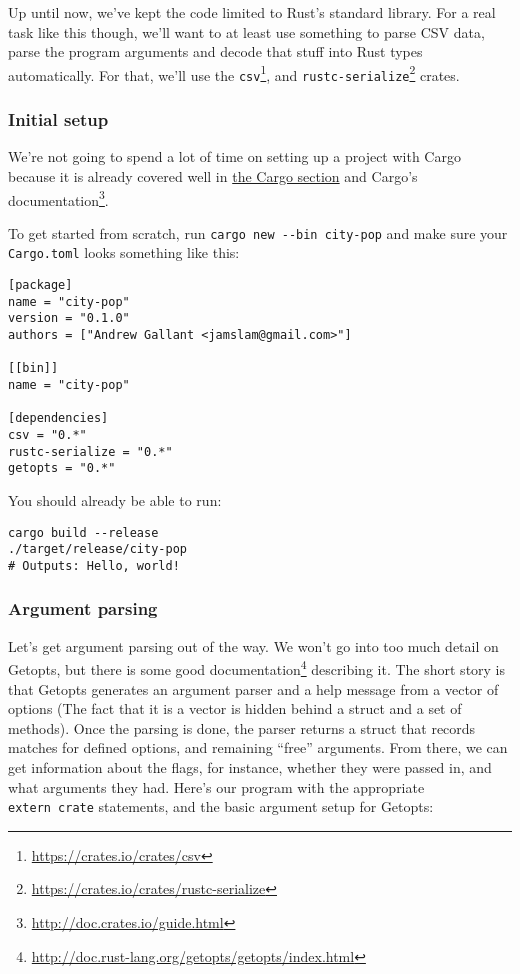 \documentclass[a4paper,]{book}
\renewcommand{\href}[2]{#2\footnote{\url{#1}}}
\begin{document}
Up until now, we've kept the code limited to Rust's standard library.
For a real task like this though, we'll want to at least use something
to parse CSV data, parse the program arguments and decode that stuff
into Rust types automatically. For that, we'll use the
\href{https://crates.io/crates/csv}{\texttt{csv}}, and
\href{https://crates.io/crates/rustc-serialize}{\texttt{rustc-serialize}}
crates.

\hypertarget{initial-setup}{\subsubsection{Initial
setup}\label{initial-setup}}

We're not going to spend a lot of time on setting up a project with
Cargo because it is already covered well in
\protect\hyperlink{hello-cargo}{the Cargo section} and
\href{http://doc.crates.io/guide.html}{Cargo's documentation}.

To get started from scratch, run \texttt{cargo\ new\ -\/-bin\ city-pop}
and make sure your \texttt{Cargo.toml} looks something like this:

\begin{verbatim}
[package]
name = "city-pop"
version = "0.1.0"
authors = ["Andrew Gallant <jamslam@gmail.com>"]

[[bin]]
name = "city-pop"

[dependencies]
csv = "0.*"
rustc-serialize = "0.*"
getopts = "0.*"
\end{verbatim}

You should already be able to run:

\begin{verbatim}
cargo build --release
./target/release/city-pop
# Outputs: Hello, world!
\end{verbatim}

\hypertarget{argument-parsing}{\subsubsection{Argument
parsing}\label{argument-parsing}}

Let's get argument parsing out of the way. We won't go into too much
detail on Getopts, but there is
\href{http://doc.rust-lang.org/getopts/getopts/index.html}{some good
documentation} describing it. The short story is that Getopts generates
an argument parser and a help message from a vector of options (The fact
that it is a vector is hidden behind a struct and a set of methods).
Once the parsing is done, the parser returns a struct that records
matches for defined options, and remaining ``free'' arguments. From
there, we can get information about the flags, for instance, whether
they were passed in, and what arguments they had. Here's our program
with the appropriate \texttt{extern\ crate} statements, and the basic
argument setup for Getopts:
\end{document}
